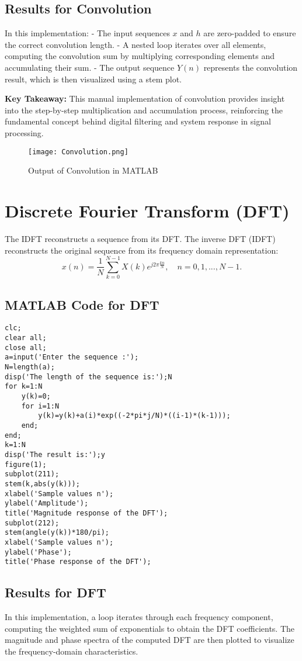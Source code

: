 \documentclass[a4paper,12pt]{article}
\begin{document}
\subsection{Results for Convolution}
In this implementation:
- The input sequences \( x \) and \( h \) are zero-padded to ensure the correct convolution length.
- A nested loop iterates over all elements, computing the convolution sum by multiplying corresponding elements and accumulating their sum.
- The output sequence \( Y(n) \) represents the convolution result, which is then visualized using a stem plot.

\textbf{Key Takeaway:} This manual implementation of convolution provides insight into the step-by-step multiplication and accumulation process, reinforcing the fundamental concept behind digital filtering and system response in signal processing.
\begin{figure}[h]
    \centering
    \texttt{[image: Convolution.png]}
    \caption{Output of Convolution in MATLAB}
    \label{fig:convolution_result}
\end{figure}

\section{ Discrete Fourier Transform (DFT)}
The IDFT reconstructs a sequence from its DFT. The inverse DFT (IDFT) reconstructs the original sequence from its frequency domain representation:
\begin{equation}
    x(n) = \frac{1}{N} \sum_{k=0}^{N-1} X(k)e^{j 2 \pi \frac{kn}{N}}, \quad n = 0,1,...,N-1.
\end{equation}
\subsection{MATLAB Code  for DFT}
\begin{verbatim}
clc;
clear all;
close all;
a=input('Enter the sequence :');
N=length(a);
disp('The length of the sequence is:');N
for k=1:N
    y(k)=0;
    for i=1:N
        y(k)=y(k)+a(i)*exp((-2*pi*j/N)*((i-1)*(k-1)));
    end;
end;
k=1:N
disp('The result is:');y
figure(1);
subplot(211);
stem(k,abs(y(k)));
xlabel('Sample values n');
ylabel('Amplitude');
title('Magnitude response of the DFT');
subplot(212);
stem(angle(y(k))*180/pi);
xlabel('Sample values n');
ylabel('Phase');
title('Phase response of the DFT');
\end{verbatim}
\newpage
\subsection{Results for DFT}
In this implementation, a loop iterates through each frequency component, computing the weighted sum of exponentials to obtain the DFT coefficients. The magnitude and phase spectra of the computed DFT are then plotted to visualize the frequency-domain characteristics. 
\end{document}
